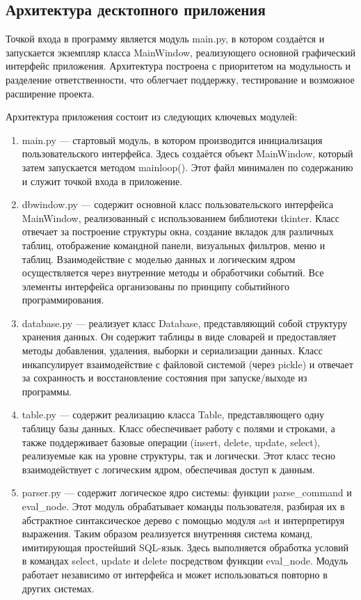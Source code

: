 \subsection{Архитектура десктопного приложения}

Точкой входа в программу является модуль main.py, в котором создаётся и запускается экземпляр класса MainWindow, реализующего основной графический интерфейс приложения. Архитектура построена с приоритетом на модульность и разделение ответственности, что облегчает поддержку, тестирование и возможное расширение проекта.

Архитектура приложения состоит из следующих ключевых модулей:
\begin{enumerate}
	\item main.py — стартовый модуль, в котором производится инициализация пользовательского интерфейса. Здесь создаётся объект MainWindow, который затем запускается методом mainloop(). Этот файл минимален по содержанию и служит точкой входа в приложение.
	\item dbwindow.py — содержит основной класс пользовательского интерфейса MainWindow, реализованный с использованием библиотеки tkinter. Класс отвечает за построение структуры окна, создание вкладок для различных таблиц, отображение командной панели, визуальных фильтров, меню и таблиц. Взаимодействие с моделью данных и логическим ядром осуществляется через внутренние методы и обработчики событий. Все элементы интерфейса организованы по принципу событийного программирования.
	\item database.py — реализует класс Database, представляющий собой структуру хранения данных. Он содержит таблицы в виде словарей и предоставляет методы добавления, удаления, выборки и сериализации данных. Класс инкапсулирует взаимодействие с файловой системой (через pickle) и отвечает за сохранность и восстановление состояния при запуске/выходе из программы.
	\item table.py — содержит реализацию класса Table, представляющего одну таблицу базы данных. Класс обеспечивает работу с полями и строками, а также поддерживает базовые операции (insert, delete, update, select), реализуемые как на уровне структуры, так и логически. Этот класс тесно взаимодействует с логическим ядром, обеспечивая доступ к данным.
	\item parser.py — содержит логическое ядро системы: функции parse\_command и eval\_node. Этот модуль обрабатывает команды пользователя, разбирая их в абстрактное синтаксическое дерево с помощью модуля ast и интерпретируя выражения. Таким образом реализуется внутренняя система команд, имитирующая простейший SQL-язык. Здесь выполняется обработка условий в командах select, update и delete посредством функции eval\_node. Модуль работает независимо от интерфейса и может использоваться повторно в других системах.
\end{enumerate}

